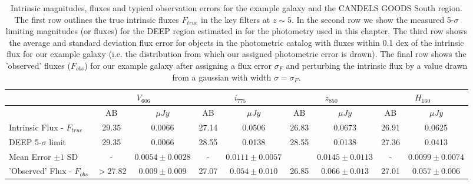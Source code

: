 \begin{landscape}
\begin{table}
    \centering
    \caption[Intrinsic magnitudes, fluxes and typical observation errors for the example galaxy and the CANDELS GOODS South region.]{Intrinsic magnitudes, fluxes and typical observation errors for the example galaxy and the CANDELS GOODS South region. The first row outlines the true intrinsic fluxes $F_{true}$ in the key filters at $z\sim5$. In the second row we show the measured 5-$\sigma$ limiting magnitudes (or fluxes) for the DEEP region estimated in \citet{Guo:2013ig} for the photometry used in this chapter. The third row shows the average and standard deviation flux error for objects in the photometric catalog \citep{Guo:2013ig} with fluxes within 0.1 dex of the intrinsic flux for our example galaxy (i.e. the distribution from which our assigned photometric error is drawn). The final row shows the 'observed' fluxes ($F_{obs}$) for our example galaxy after assigning a flux error $\sigma_{F}$ and perturbing the intrinsic flux by a value drawn from a gaussian with width $\sigma = \sigma_{F}$.}
    \begin{tabular}{lcccccccc}
    \hline
    ~                      & \multicolumn{2}{c}{$V_{606}$} & \multicolumn{2}{c}{$i_{775}$} & \multicolumn{2}{c}{$z_{850}$} & \multicolumn{2}{c}{$H_{160}$} \\ \hline
    ~                      & AB        & $\mu Jy$ & AB & $\mu Jy$ & AB & $\mu Jy$ & AB   & $\mu Jy$ \\ \hline
    Intrinsic Flux - $F_{true}$           & 29.35         & 0.0066   & 27.14  & 0.0506  & 26.83  & 0.0673 & 26.91 &  0.0625  \\
    DEEP 5-$\sigma$ limit   & 29.35        & 0.0066   & 28.55  & 0.0138  & 28.55  & 0.0138 & 27.36 &  0.0413   \\
    Mean Error $\pm 1$ SD  & -         & $0.0054\pm0.0028$    & -  & $0.0111 \pm  0.0057$  &   & $0.0145 \pm 0.0113$   &   -   & $0.0099 \pm 0.0074$ \\ 
    'Observed' Flux - $F_{obs}$  & $>27.82$     & $0.009 \pm 0.009$  & 27.07  & $0.054\pm0.010$  & 26.85 & $0.066\pm0.013$   & 27.01        & $0.057 \pm 0.006$   \\
    \hline
    \end{tabular}\label{tab:eg_photom}
\end{table}
\end{landscape}
 
